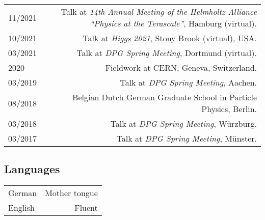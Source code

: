 \begin{tabular}{L!{\VRule}R}
  11/2021 & Talk at \emph{14th Annual Meeting of the Helmholtz Alliance ``Physics at the Terascale''}, Hamburg (virtual). \\[0.1em]
  10/2021 & Talk at \emph{Higgs 2021}, Stony Brook (virtual), USA. \\[0.1em]
  03/2021 & Talk at \emph{DPG Spring Meeting}, Dortmund (virtual). \\[0.1em]
  2020 & Fieldwork at CERN, Geneva, Switzerland. \\[0.1em]
  03/2019 & Talk at \emph{DPG Spring Meeting}, Aachen. \\[0.1em]
  08/2018 & Belgian Dutch German Graduate School in Particle Physics, Berlin. \\[0.1em]
  03/2018 & Talk at \emph{DPG Spring Meeting}, Würzburg. \\[0.1em]
  03/2017 & Talk at \emph{DPG Spring Meeting}, Münster.
\end{tabular}

\vspace*{1em}
\subsection*{Languages}

\begin{tabular}{L!{\VRule}R}
German  & Mother tongue \\[0.1em]
English & Fluent
\end{tabular}

